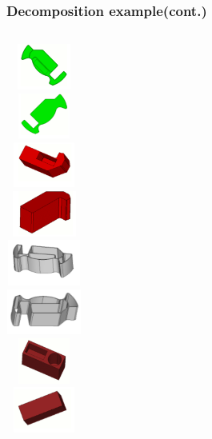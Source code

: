 \documentclass[fleqn]{beamer}
\begin{document}
  \begin{frame}
 \frametitle{Decomposition example(cont.)}
 \begin{columns}[t]
 \centering
 \includegraphics[width=2.5cm,height=1.5cm]{figures/s1.png}\\
 \includegraphics[width=2.5cm,height=1.5cm]{figures/t1.png}\\
 \centering
 \includegraphics[width=2.5cm,height=1.5cm]{figures/s2.png}\\
 \includegraphics[width=2.5cm,height=1.5cm]{figures/t2.png}\\
 \centering
 \includegraphics[width=2.5cm,height=1.5cm]{figures/s3.png}\\
 \includegraphics[width=2.5cm,height=1.5cm]{figures/t3.png}\\
 \centering
 \includegraphics[width=2.5cm,height=1.5cm]{figures/s4.png}\\
 \includegraphics[width=2.5cm,height=1.5cm]{figures/t4.png}\\

\end{columns}
\end{frame}
\end{document}
